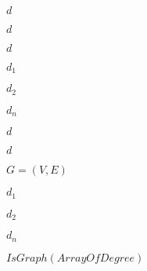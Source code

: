 \documentclass[10pt]{book}
\begin{document}
\begin{mdSnippets}
\begin{mdInlineSnippet}[8277e0910d750195b448797616e091ad]%
$d$\end{mdInlineSnippet}%
\begin{mdInlineSnippet}[8277e0910d750195b448797616e091ad]%
$d$\end{mdInlineSnippet}%
\begin{mdInlineSnippet}[8277e0910d750195b448797616e091ad]%
$d$\end{mdInlineSnippet}%
\begin{mdInlineSnippet}[03d3ca3fa2226c9a550d3f4cef0a1dd5]%
$d_1$\end{mdInlineSnippet}%
\begin{mdInlineSnippet}[8db9f9980d085b9184a30924aa6c6853]%
$d_2$\end{mdInlineSnippet}%
\begin{mdInlineSnippet}[651ab8454e84d1102fad6883fd42c265]%
$d_n$\end{mdInlineSnippet}%
\begin{mdInlineSnippet}[8277e0910d750195b448797616e091ad]%
$d$\end{mdInlineSnippet}%
\begin{mdInlineSnippet}[8277e0910d750195b448797616e091ad]%
$d$\end{mdInlineSnippet}%
\begin{mdInlineSnippet}%
$G = (V, E)$\end{mdInlineSnippet}%
\begin{mdInlineSnippet}[03d3ca3fa2226c9a550d3f4cef0a1dd5]%
$d_1$\end{mdInlineSnippet}%
\begin{mdInlineSnippet}[8db9f9980d085b9184a30924aa6c6853]%
$d_2$\end{mdInlineSnippet}%
\begin{mdInlineSnippet}[651ab8454e84d1102fad6883fd42c265]%
$d_n$\end{mdInlineSnippet}%
\begin{mdInlineSnippet}[cca4a712d25fe496660b1c4c11709b02]%
$IsGraph(Array Of Degree)$\end{mdInlineSnippet}%

\end{mdSnippets}
\end{document}
